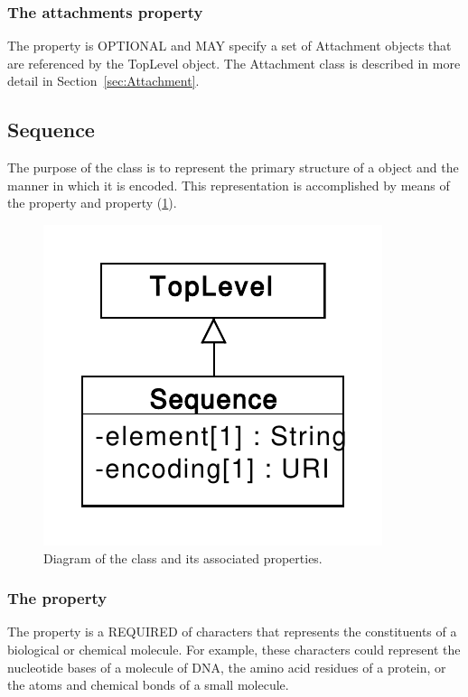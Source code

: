 \subsubsection*{The attachments property}
\label{sec:attachments}
The  property is OPTIONAL and MAY specify a set of Attachment objects that are referenced by the TopLevel object. The Attachment class is described in more detail in Section~\ref{sec:Attachment}.

\subsection{Sequence}
\label{sec:Sequence}
The purpose of the  class is to represent the primary structure of a  object and the manner in which it is encoded. This representation is accomplished  by means of the  property and  property (\ref{uml:sequence}).

\begin{figure}[ht]
\begin{center}
\includegraphics[scale=0.6]{uml/sequence}
\caption[]{Diagram of the  class and its associated properties.}
\label{uml:sequence}
\end{center}
\end{figure}


\subsubsection*{The  property}
\label{sec:elements}
The  property is a REQUIRED  of characters that represents the constituents of a biological or chemical molecule. For example, these characters could represent the nucleotide bases of a molecule of DNA, the amino acid residues of a protein, or the atoms and chemical bonds of a small molecule.

